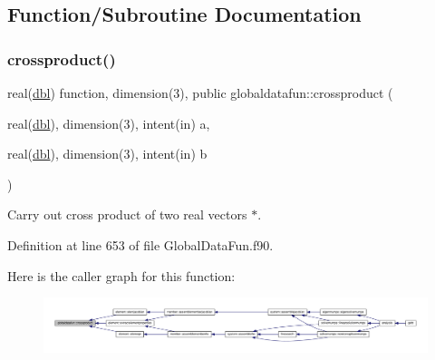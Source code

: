 \subsection{Function/\+Subroutine Documentation}
\mbox{\label{namespaceglobaldatafun_a5b4feec69bb3f3464bcd8c08406f9c82}} 
\subsubsection{\texorpdfstring{crossproduct()}{crossproduct()}}
{\footnotesize\ttfamily real(\hyperlink{namespaceglobaldatafun_a5008801201dd34f2af8eae07756befb4}{dbl}) function, dimension(3), public globaldatafun\+::crossproduct (\begin{DoxyParamCaption}\item[{real(\hyperlink{namespaceglobaldatafun_a5008801201dd34f2af8eae07756befb4}{dbl}), dimension(3), intent(in)}]{a,  }\item[{real(\hyperlink{namespaceglobaldatafun_a5008801201dd34f2af8eae07756befb4}{dbl}), dimension(3), intent(in)}]{b }\end{DoxyParamCaption})}



Carry out cross product of two real vectors $\ast$. 



Definition at line 653 of file Global\+Data\+Fun.\+f90.

Here is the caller graph for this function\+:\nopagebreak
\begin{figure}[H]
\begin{center}
\leavevmode
\includegraphics[width=350pt]{namespaceglobaldatafun_a5b4feec69bb3f3464bcd8c08406f9c82_icgraph}
\end{center}
\end{figure}
\mbox{\label{namespaceglobaldatafun_a166b3774feeda05d1e3d1761c1412e85}} 
